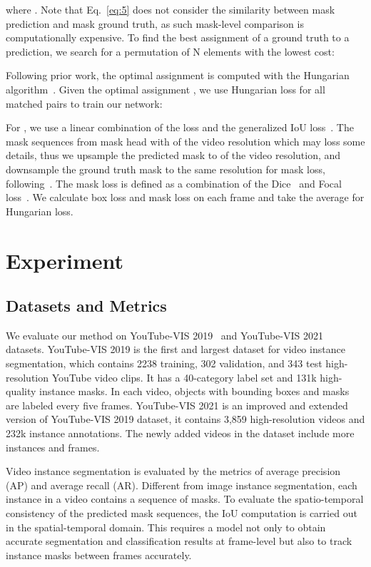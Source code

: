 \documentclass[runningheads]{llncs}
\begin{document}
where . 
Note that Eq.~\ref{eq:5} does not consider the similarity between mask prediction and mask ground truth, as such mask-level comparison is computationally expensive.
To find the best assignment of a ground truth to a prediction, we search for a permutation of N elements  with the lowest cost:



Following prior work\cite{detr,VisTR}, the optimal assignment is computed with the Hungarian algorithm~\cite{kuhn1955hungarian}. Given the optimal assignment   , we use Hungarian loss for all matched pairs to train our network:

For , we use a linear combination of the   loss and the generalized IoU loss~\cite{rezatofighi2019generalized}. The mask sequences  from mask head with  of the video resolution which may loss some details, thus we upsample the predicted mask to  of the video resolution, and downsample the ground truth mask to the same resolution for mask loss, following~\cite{tian2020conditional}. The mask loss  is defined as a combination of the Dice~\cite{milletari2016v} and Focal loss~\cite{lin2017focal}. 
We calculate box loss and mask loss on each frame and take the average for Hungarian loss.






\section{Experiment}
\subsection{ Datasets and Metrics }
We evaluate our method on YouTube-VIS 2019~\cite{yang2019video} and YouTube-VIS 2021~\cite{ytvis21dataset} datasets. YouTube-VIS 2019 is the first and largest dataset for video instance segmentation, which contains 2238 training, 302 validation, and 343 test high-resolution YouTube video clips. It has a 40-category label set and 131k high-quality instance masks. In each video, objects with bounding boxes and masks are labeled every five frames. YouTube-VIS 2021 is an improved and extended version of YouTube-VIS 2019 dataset, it contains 3,859 high-resolution videos and 232k instance annotations. The newly added videos in the dataset include more instances and frames.

Video instance segmentation is evaluated by the metrics of average precision (AP) and average recall (AR). Different from image instance segmentation, each instance in a video contains a sequence of masks. 
To evaluate the spatio-temporal consistency of the predicted mask sequences, the IoU computation is carried out in the spatial-temporal domain. This requires a model not only to obtain accurate segmentation and classification results at frame-level but also to track instance masks between frames accurately.
\end{document}
